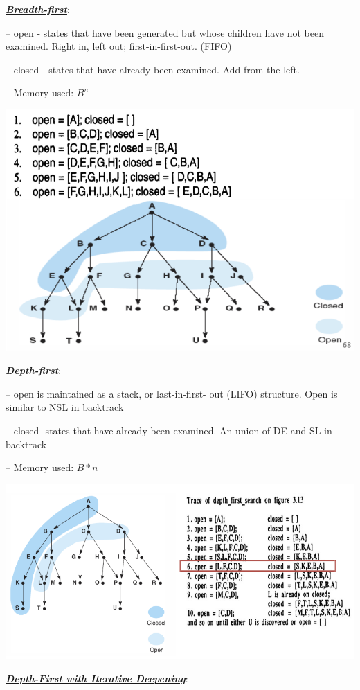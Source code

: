 \documentclass[12pt]{article}
\newcommand{\bulletPoint}[1]{\ul{\textit{\textbf{#1}}}}
\begin{document}
\begin{multicols*}{2}
\bulletPoint{Breadth-first}:

– open - states that have been generated but whose children have not been examined. Right in, left out; first-in-first-out. (FIFO)

– closed - states that have already been examined. Add from the left. 

– Memory used: $B ^ n$

\includegraphics[scale=0.3]{images/breadth-first.png}

\bulletPoint{Depth-first}:

–  open is maintained as a stack, or last-in-first- out (LIFO) structure. Open is similar to NSL in backtrack

– closed‐ states that have already been examined. An union of DE and SL in backtrack

– Memory used: $B * n$

\includegraphics[scale=0.3]{images/depth-first.png}

\bulletPoint{Depth-First with Iterative Deepening}:


\end{multicols*}
\end{document}
